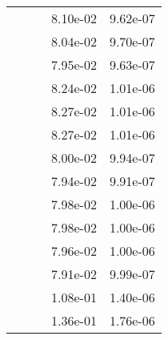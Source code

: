\begin{table}
\begin{tabular}{c|cc|cc|}
\multicolumn{1}{|c|}{} & \multicolumn{1}{|c|}{} & \multicolumn{1}{|c|}{} & \multicolumn{1}{|c|}{  8.10e-02} & \multicolumn{1}{|c|}{  9.62e-07} \\ 
\multicolumn{1}{|c|}{} & \multicolumn{1}{|c|}{} & \multicolumn{1}{|c|}{} & \multicolumn{1}{|c|}{  8.04e-02} & \multicolumn{1}{|c|}{  9.70e-07} \\ 
\multicolumn{1}{|c|}{} & \multicolumn{1}{|c|}{} & \multicolumn{1}{|c|}{} & \multicolumn{1}{|c|}{  7.95e-02} & \multicolumn{1}{|c|}{  9.63e-07} \\ 
\multicolumn{1}{|c|}{} & \multicolumn{1}{|c|}{} & \multicolumn{1}{|c|}{} & \multicolumn{1}{|c|}{  8.24e-02} & \multicolumn{1}{|c|}{  1.01e-06} \\ 
\multicolumn{1}{|c|}{} & \multicolumn{1}{|c|}{} & \multicolumn{1}{|c|}{} & \multicolumn{1}{|c|}{  8.27e-02} & \multicolumn{1}{|c|}{  1.01e-06} \\ 
\multicolumn{1}{|c|}{} & \multicolumn{1}{|c|}{} & \multicolumn{1}{|c|}{} & \multicolumn{1}{|c|}{  8.27e-02} & \multicolumn{1}{|c|}{  1.01e-06} \\ 
\multicolumn{1}{|c|}{} & \multicolumn{1}{|c|}{} & \multicolumn{1}{|c|}{} & \multicolumn{1}{|c|}{  8.00e-02} & \multicolumn{1}{|c|}{  9.94e-07} \\ 
\multicolumn{1}{|c|}{} & \multicolumn{1}{|c|}{} & \multicolumn{1}{|c|}{} & \multicolumn{1}{|c|}{  7.94e-02} & \multicolumn{1}{|c|}{  9.91e-07} \\ 
\multicolumn{1}{|c|}{} & \multicolumn{1}{|c|}{} & \multicolumn{1}{|c|}{} & \multicolumn{1}{|c|}{  7.98e-02} & \multicolumn{1}{|c|}{  1.00e-06} \\ 
\multicolumn{1}{|c|}{} & \multicolumn{1}{|c|}{} & \multicolumn{1}{|c|}{} & \multicolumn{1}{|c|}{  7.98e-02} & \multicolumn{1}{|c|}{  1.00e-06} \\ 
\multicolumn{1}{|c|}{} & \multicolumn{1}{|c|}{} & \multicolumn{1}{|c|}{} & \multicolumn{1}{|c|}{  7.96e-02} & \multicolumn{1}{|c|}{  1.00e-06} \\ 
\multicolumn{1}{|c|}{} & \multicolumn{1}{|c|}{} & \multicolumn{1}{|c|}{} & \multicolumn{1}{|c|}{  7.91e-02} & \multicolumn{1}{|c|}{  9.99e-07} \\ 
\multicolumn{1}{|c|}{} & \multicolumn{1}{|c|}{} & \multicolumn{1}{|c|}{} & \multicolumn{1}{|c|}{  1.08e-01} & \multicolumn{1}{|c|}{  1.40e-06} \\ 
\multicolumn{1}{|c|}{} & \multicolumn{1}{|c|}{} & \multicolumn{1}{|c|}{} & \multicolumn{1}{|c|}{  1.36e-01} & \multicolumn{1}{|c|}{  1.76e-06} \\ 

\end{tabular}
\end{table}
